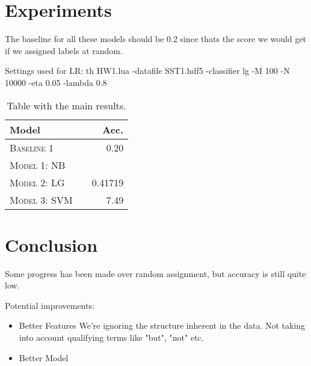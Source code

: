 \documentclass[11pt]{article}
\begin{document}
\section{Experiments}

The baseline for all these models should be 0.2 since thats the score we would
get if we assigned labels at random.

Settings used for LR: th HW1.lua -datafile SST1.hdf5 -classifier lg -M 100
-N 10000 -eta 0.05 -lambda 0.8

\begin{table}[h]
\centering
\begin{tabular}{llr}
 \toprule
 Model &  & Acc. \\
 \midrule
 \textsc{Baseline 1} & & 0.20\\
 \textsc{Model 1: NB} & &  \\
 \textsc{Model 2: LG} & & 0.41719 \\
 \textsc{Model 3: SVM} & & 7.49\\
 \bottomrule
\end{tabular}
\caption{\label{tab:results} Table with the main results.}
\end{table}

\section{Conclusion}

Some progress has been made over random assignment, but accuracy is still quite
low.

Potential improvements:

\begin{itemize}
  \item Better Features
  We're ignoring the structure inherent in the data. Not taking into account
  qualifying terms like "but", "not" etc.

  \item Better Model
\end{itemize}



\end{document}
